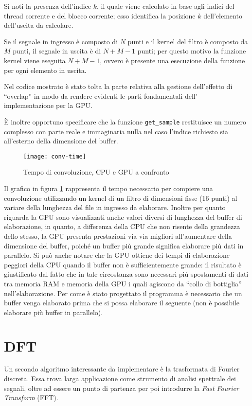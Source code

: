 Si noti la presenza dell'indice $k$, il quale viene calcolato in base agli indici del thread corrente e del blocco corrente; esso identifica la posizione $k$ dell'elemento dell'uscita da calcolare. 

Se il segnale in ingresso è composto di $N$ punti e il kernel del filtro è composto da $M$ punti, il segnale in uscita è di $N+M-1$ punti; per questo motivo la funzione kernel viene eseguita $N+M-1$, ovvero è presente una esecuzione della funzione per ogni elemento in uscita.

Nel codice mostrato è stato tolta la parte relativa alla gestione dell'effetto di ``overlap'' in modo da rendere evidenti le parti fondamentali dell' implementazione per la GPU.

È inoltre opportuno specificare che la funzione \lstinline{get_sample} restituisce un numero complesso con parte reale e immaginaria nulla nel caso l'indice richiesto sia all'esterno della dimensione del buffer.

\begin{figure}[h]
    \centering
    \texttt{[image: conv-time]}
    \caption{Tempo di convoluzione, CPU e GPU a confronto}
    \label{fig:convtime}
\end{figure}

Il grafico in figura \ref{fig:convtime} rappresenta il tempo necessario per compiere una convoluzione utilizzando un kernel di un filtro di dimensioni fisse (16 punti) al variare della lunghezza del file in ingresso da elaborare. Inoltre per quanto riguarda la GPU sono visualizzati anche valori diversi di lunghezza del buffer di elaborazione, in quanto, a differenza della CPU che non risente della grandezza dello stesso, la GPU presenta prestazioni via via migliori all'aumentare della dimensione del buffer, poiché un buffer più grande significa elaborare più dati in parallelo. Si può anche notare che la GPU ottiene dei tempi di elaborazione peggiori della CPU quando il buffer non è sufficientemente grande: il risultato è giustificato dal fatto che in tale circostanza sono necessari più spostamenti di dati tra memoria RAM e memoria della GPU i quali agiscono da ``collo di bottiglia'' nell'elaborazione. Per come è stato progettato il programma è necessario che un buffer venga elaborato prima che si possa elaborare il seguente (non è possibile elaborare più buffer in parallelo).

\section{DFT}
Un secondo algoritmo interessante da implementare è la trasformata di Fourier discreta. Essa trova larga applicazione come strumento di analisi spettrale dei segnali, oltre ad essere un punto di partenza per poi introdurre la \textit{Fast Fourier Transform} (FFT).

